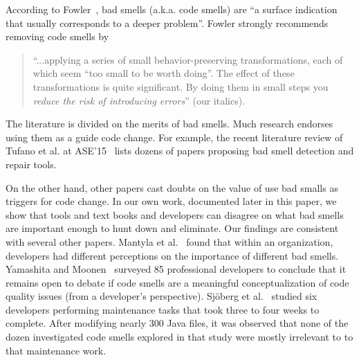 \documentclass{sig-alternate}
\begin{document}




\noindent
According to   Fowler~\cite{fowler99}, bad smells (a.k.a. code smells)
are ``a surface indication that usually corresponds to a deeper problem''.
Fowler strongly recommends   removing   code smells   by
\begin{quote}
``...applying a series of small behavior-preserving transformations, each 
of which seem ``too small to be worth doing''. 
The  effect of   these transformations is quite significant. By doing them in small steps you {\em reduce the risk of introducing errors}'' (our italics).
\end{quote}
The literature is divided on the merits of bad smells.
Much research  endorses using them as a guide
code change. For example,
the recent literature review of Tufano et al. at ASE'15~\cite{Tufano2015}  
lists dozens of  
papers proposing bad smell detection and repair tools. 

On the other hand, other papers cast doubts on the value of use bad smalls
as triggers for code change.
In our own work, documented later in this paper, we  show
that tools and text books and developers can disagree on what bad smells
are important enough to hunt down and eliminate. Our findings
are consistent with several other papers.
Mantyla et al.~\cite{Mantyla2004} found that within an organization,
 developers had different perceptions on the importance of different
 bad smells.    Yamashita  and Moonen~\cite{Yamashita2013}
 surveyed 85 professional developers to conclude that it remains
 open to debate if code smells are a meaningful conceptualization  of code quality issues (from a developer's perspective). 
 Sj\"oberg et al.~\cite{Sjoberg2013} studied six developers 
 performing maintenance tasks that took three to four weeks to complete. 
 After modifying nearly 300 Java files, it was observed
 that none of the dozen investigated code smells explored in 
 that study were mostly irrelevant to to that maintenance work.
 
\end{document}
